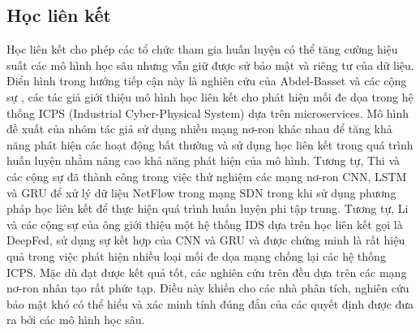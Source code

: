 \subsection{{Học liên kết}}
Học liên kết cho phép các tổ chức tham gia huấn luyện có thể tăng cường hiệu suất các mô hình học sâu nhưng vẫn giữ được sử bảo mật và riêng tư của dữ liệu. Điển hình trong hướng tiếp cận này là nghiên cứu của Abdel-Basset và các cộng sự \cite{abdel2021federated}, các tác giả giới thiệu mô hình học liên kết cho phát hiện mối đe dọa trong hệ thống ICPS (Industrial Cyber-Physical System) dựa trên microservices. Mô hình đề xuất của nhóm tác giả sử dụng nhiều mạng nơ-ron khác nhau để tăng khả năng phát hiện các hoạt động bất thường và sử dụng học liên kết trong quá trình huấn luyện nhằm nâng cao khả năng phát hiện của mô hình. Tương tự, Thi và các cộng sự \cite{thi2022federated} đã thành công trong việc thử nghiệm các mạng nơ-ron CNN, LSTM và GRU để xử lý dữ liệu NetFlow trong mạng SDN trong khi sử dụng phương pháp học liên kết để thực hiện quá trình huấn luyện phi tập trung. Tương tự, Li và các cộng sự của ông \cite{9195012} giới thiệu một hệ thống IDS dựa trên học liên kết gọi là DeepFed, sử dụng sự kết hợp của CNN và GRU và được chứng minh là rất hiệu quả trong việc phát hiện nhiều loại mối đe dọa mạng chống lại các hệ thống ICPS. Mặc dù đạt được kết quả tốt, các nghiên cứu trên đều dựa trên các mạng nơ-ron nhân tạo rất phức tạp. Điều này khiến cho các nhà phân tích, nghiên cứu bảo mật khó có thể hiểu và xác minh tính đúng đắn của các quyết định được đưa ra bởi các mô hình học sâu.

